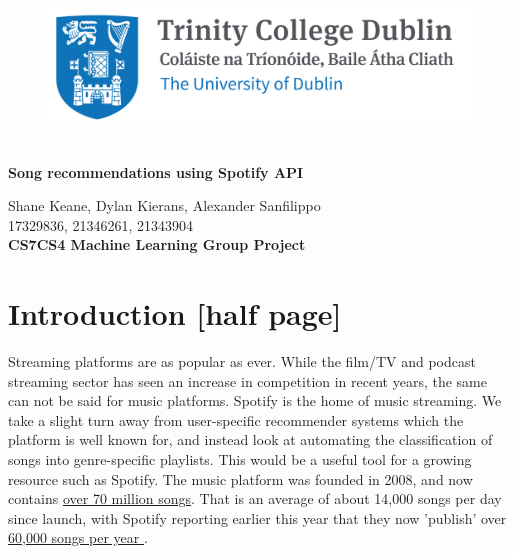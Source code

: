 \documentclass[12pt, a4]{article} %
\begin{document}
\onecolumn


\thispagestyle{empty}
\begin{center}

\begin{figure}[h!]
    \centering
    \includegraphics[width=\linewidth]{Trinity Logo.jpg}
\end{figure}

\noindent\makebox[\linewidth]{\centering \rule{.7\paperwidth}{0.4pt}} \\
\vspace{.4cm} 
\Large \textbf{Song recommendations using Spotify API}  \\
\vspace{.5cm}

Shane Keane, Dylan Kierans, Alexander Sanfilippo \\17329836, 21346261, 21343904\\
\vspace{.4cm}
\textbf{ CS7CS4 Machine Learning Group Project} \\
\vspace{.4cm} 
\noindent\makebox[\linewidth]{\centering \rule{.7\paperwidth}{0.4pt}}
\end{center}

\tableofcontents

\newpage
\section*{Introduction [half page]}
Streaming platforms are as popular as ever. While the film/TV and podcast streaming sector has seen an increase in competition in recent years, the same can not be said for music platforms. Spotify is the home of music streaming. We take a slight turn away from user-specific recommender systems which the platform is well known for, and instead look at automating the classification of songs into genre-specific playlists. This would be a useful tool for a growing resource such as Spotify. The music platform was founded in 2008, and now contains \href{https://newsroom.spotify.com/company-info/}{over 70 million songs}. That is an average of about 14,000 songs per day since launch, with Spotify reporting earlier this year that they now 'publish' over \href{https://www.youtube.com/watch?v=Vvo-2MrSgFE&ab_channel=Spotify}{60,000 songs per year }. \newline
\end{document}
